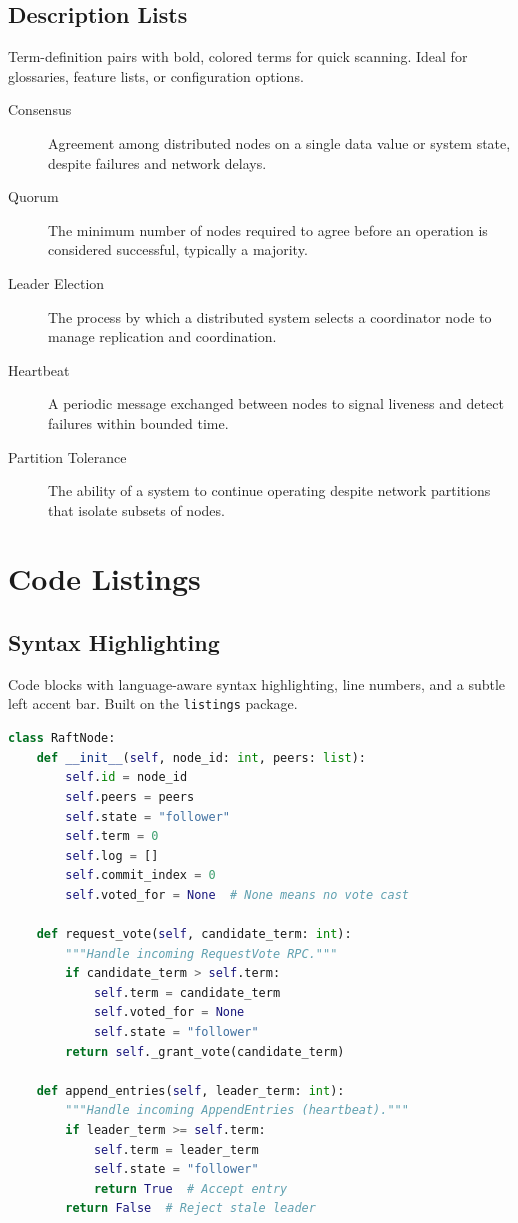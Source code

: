 \documentclass[12pt]{article}
\begin{document}
\subsection{Description Lists}
Term-definition pairs with bold, colored terms for quick scanning.
Ideal for glossaries, feature lists, or configuration options.

\begin{description}
  \item[Consensus] Agreement among distributed nodes on a single
    data value or system state, despite failures and network delays.
  \item[Quorum] The minimum number of nodes required to agree before
    an operation is considered successful, typically a majority.
  \item[Leader Election] The process by which a distributed system
    selects a coordinator node to manage replication and coordination.
  \item[Heartbeat] A periodic message exchanged between nodes to
    signal liveness and detect failures within bounded time.
  \item[Partition Tolerance] The ability of a system to continue
    operating despite network partitions that isolate subsets of nodes.
\end{description}

\section{Code Listings}

\subsection{Syntax Highlighting}
Code blocks with language-aware syntax highlighting, line numbers,
and a subtle left accent bar. Built on the \texttt{listings} package.

\begin{lstlisting}[language=Python, caption={Raft-style consensus implementation}]
class RaftNode:
    def __init__(self, node_id: int, peers: list):
        self.id = node_id
        self.peers = peers
        self.state = "follower"
        self.term = 0
        self.log = []
        self.commit_index = 0
        self.voted_for = None  # None means no vote cast

    def request_vote(self, candidate_term: int):
        """Handle incoming RequestVote RPC."""
        if candidate_term > self.term:
            self.term = candidate_term
            self.voted_for = None
            self.state = "follower"
        return self._grant_vote(candidate_term)

    def append_entries(self, leader_term: int):
        """Handle incoming AppendEntries (heartbeat)."""
        if leader_term >= self.term:
            self.term = leader_term
            self.state = "follower"
            return True  # Accept entry
        return False  # Reject stale leader
\end{lstlisting}
\end{document}
